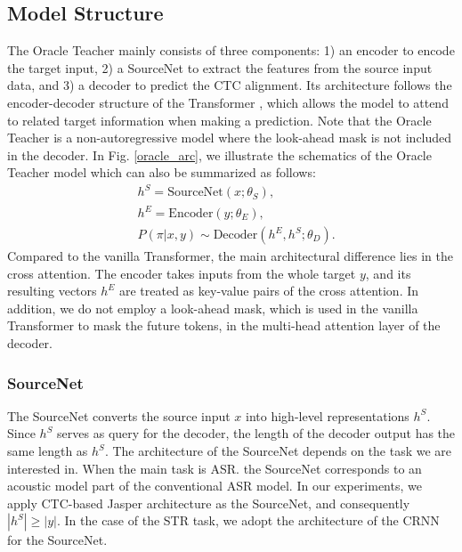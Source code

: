 \documentclass[journal]{IEEEtran}
\begin{document}
\subsection{Model Structure}
\label{oracle_model_structure}
The Oracle Teacher mainly consists of three components: 1) an encoder to encode the target input, 2) a SourceNet to extract the features from the source input data, and 3) a decoder to predict the CTC alignment.
Its architecture follows the encoder-decoder structure of the Transformer \cite{transformer:scheme}, which allows the model to attend to related target information when making a prediction.
Note that the Oracle Teacher is a non-autoregressive model where the look-ahead mask is not included in the decoder.
In Fig. \ref{oracle_arc}, we illustrate the schematics of the Oracle Teacher model which can also be
summarized as follows:
\begin{align}
\label{oracle_align}
  & h^{S}=\text{SourceNet}(x;\theta_{S}), \\
  & h^{E}=\text{Encoder}(y;\theta_{E}), \\
  & P(\pi|x,y) \sim \text{Decoder}(h^{E}, h^{S};\theta_{D}). 
 \end{align}
Compared to the vanilla Transformer, the main architectural difference lies in the cross attention. The encoder takes inputs from the whole target $y$, and its resulting vectors $h^{E}$ are treated as key-value pairs of the cross attention.
In addition, we do not employ a look-ahead mask, which is used in the vanilla Transformer to mask the future tokens, in the multi-head attention layer of the decoder.

\subsubsection{SourceNet}
The SourceNet converts the source input $x$ into high-level representations $h^{S}$.
Since $h^{S}$ serves as query for the decoder, the length of the decoder output has the same length as $h^{S}$.
The architecture of the SourceNet depends on the task we are interested in.
When the main task is ASR. the SourceNet corresponds to an acoustic model part of the conventional ASR model.
In our experiments, we apply CTC-based Jasper \cite{jasper:scheme} architecture as the SourceNet, and consequently $|h^{S}|\geq|y|$. 
In the case of the STR task, we adopt the architecture of the CRNN \cite{crnn:scheme} for the SourceNet.
\end{document}
